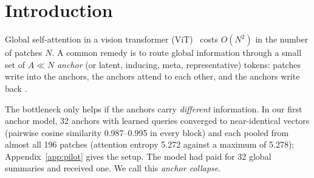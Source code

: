 \documentclass[runningheads]{llncs}
\begin{document}
\section{Introduction}

Global self-attention in a vision transformer (ViT)~\cite{dosovitskiy2021vit} costs $O(N^2)$ in
the number of patches $N$. A common remedy is to route global information through a small set of
$A\ll N$ \emph{anchor} (or latent, inducing, meta, representative) tokens: patches write into the
anchors, the anchors attend to each other, and the anchors write back
\cite{lee2019settransformer,jaegle2021perceiver,grainger2023paca,jiang2024lemevit,anchorformer2025,representative2026}.

The bottleneck only helps if the anchors carry \emph{different} information. In our first anchor
model, 32 anchors with learned queries converged to near-identical vectors (pairwise cosine
similarity 0.987--0.995 in every block) and each pooled from almost all 196 patches (attention
entropy 5.272 against a maximum of 5.278); Appendix~\ref{app:pilot} gives the setup. The model
had paid for 32 global summaries and received one. We call this \emph{anchor collapse}.
\end{document}
